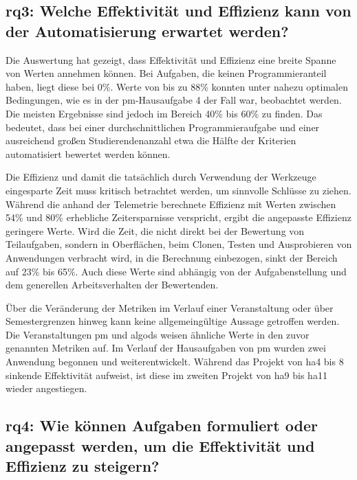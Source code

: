 \subsection[\acs{rq}3]{\ac{rq}3: Welche Effektivität und Effizienz kann von der Automatisierung erwartet werden?}\label{subsec:ra3-effectivity-efficiency}

Die Auswertung hat gezeigt, dass Effektivität und Effizienz eine breite Spanne von Werten annehmen können.
Bei Aufgaben, die keinen Programmieranteil haben, liegt diese bei 0\%.
Werte von bis zu 88\% konnten unter nahezu optimalen Bedingungen, wie es in der \ac{pm}-Hausaufgabe 4 der Fall war, beobachtet werden.
Die meisten Ergebnisse sind jedoch im Bereich 40\% bis 60\% zu finden.
Das bedeutet, dass bei einer durchschnittlichen Programmieraufgabe und einer ausreichend großen Studierendenanzahl etwa die Hälfte der Kriterien automatisiert bewertet werden können.

Die Effizienz und damit die tatsächlich durch Verwendung der Werkzeuge eingesparte Zeit muss kritisch betrachtet werden, um sinnvolle Schlüsse zu ziehen.
Während die anhand der Telemetrie berechnete Effizienz mit Werten zwischen 54\% und 80\% erhebliche Zeitersparnisse verspricht, ergibt die angepasste Effizienz geringere Werte.
Wird die Zeit, die nicht direkt bei der Bewertung von Teilaufgaben, sondern in Oberflächen, beim Clonen, Testen und Ausprobieren von Anwendungen verbracht wird, in die Berechnung einbezogen, sinkt der Bereich auf 23\% bis 65\%.
Auch diese Werte sind abhängig von der Aufgabenstellung und dem generellen Arbeitsverhalten der Bewertenden.

Über die Veränderung der Metriken im Verlauf einer Veranstaltung oder über Semestergrenzen hinweg kann keine allgemeingültige Aussage getroffen werden.
Die Veranstaltungen \ac{pm} und \ac{algods} weisen ähnliche Werte in den zuvor genannten Metriken auf.
Im Verlauf der Hausaufgaben von \ac{pm} wurden zwei Anwendung begonnen und weiterentwickelt.
Während das Projekt von \ac{ha}4 bis 8 sinkende Effektivität aufweist, ist diese im zweiten Projekt von \ac{ha}9 bis \ac{ha}11 wieder angestiegen.

\subsection[\acs{rq}4]{\ac{rq}4: Wie können Aufgaben formuliert oder angepasst werden, um die Effektivität und Effizienz zu steigern?}\label{subsec:ra4-improve-effectivity-efficiency}

